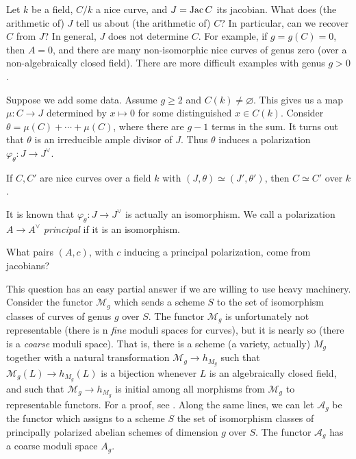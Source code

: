 \documentclass{article}
\begin{document}
Let $k$ be a field, $C/k$ a nice curve, and $J=\operatorname{Jac} C$ its jacobian. What does 
(the arithmetic of) $J$ tell us about (the arithmetic of) $C$? In particular, 
can we recover $C$ from $J$? In general, $J$ does not determine $C$. For 
example, if $g=g(C)=0$, then $A=0$, and there are many non-isomorphic nice 
curves of genus zero (over a non-algebraically closed field). There are more 
difficult examples with genus $g>0$. 

Suppose we add some data. Assume $g\geqslant 2$ and $C(k)\ne\varnothing$. This 
gives us a map $\mu:C\to J$ determined by $x\mapsto 0$ for some distinguished 
$x\in C(k)$. Consider $\theta = \mu(C)+\cdots + \mu(C)$, where there are $g-1$ 
terms in the sum. It turns out that $\theta$ is an irreducible ample divisor of 
$J$. Thus $\theta$ induces a polarization $\varphi_\theta:J\to J^\vee$. 

\begin{theorem}[Torelli]
If $C,C'$ are nice curves over a field $k$ with $(J,\theta)\simeq (J',\theta')$, 
then $C\simeq C'$ over $k$. 
\end{theorem}

It is known that $\varphi_\theta:J\to J^\vee$ is actually an isomorphism. We 
call a polarization $A\to A^\vee$ \emph{principal} if it is an isomorphism. 

\begin{question}[Schottky]
What pairs $(A,c)$, with $c$ inducing a principal polarization, come from 
jacobians? 
\end{question}

This question has an easy partial answer if we are willing to use heavy 
machinery. Consider the functor $\mathcal{M}_g$ which sends a scheme $S$ to the 
set of isomorphism classes of curves of genus $g$ over $S$. The functor 
$\mathcal{M}_g$ is unfortunately not representable (there is n 
\emph{fine} moduli spaces for curves), but it is nearly so (there is a 
\emph{coarse} moduli space). That is, there is a scheme (a variety, 
actually) $M_g$ together with a natural transformation 
$\mathcal{M}_g\to h_{M_g}$ such that $\mathcal{M}_g(L)\to h_{M_g}(L)$ is a 
bijection whenever $L$ is an algebraically closed field, and such that 
$\mathcal{M}_g\to h_{M_g}$ is initial among all morphisms from $\mathcal{M}_g$ 
to representable functors. For a proof, see \cite[5]{mu94}. Along the same lines, 
we can let $\mathcal{A}_g$ be the functor which assigns to a scheme $S$ the set 
of isomorphism classes of principally polarized abelian schemes of dimension 
$g$ over $S$. The functor $\mathcal{A}_g$ has a coarse moduli space $A_g$. 
\end{document}
